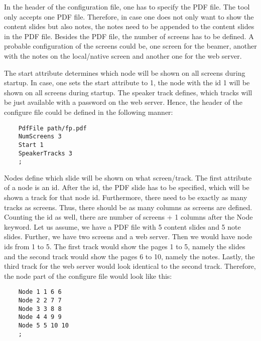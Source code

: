     In the header of the configuration file, one has to specify the PDF file.
    The tool only accepts one PDF file.
    Therefore, in case one does not only want to show the content slides but also notes, the notes need to be appended to the content slides in the PDF file.
    Besides the PDF file, the number of screens has to be defined.
    A probable configuration of the screens could be, one screen for the beamer, another with the notes on the local/native screen and another one for the web server.
    
    The start attribute determines which node will be shown on all screens during startup.
    In case, one sets the start attribute to 1, the node with the id 1 will be shown on all screens during startup.
    The speaker track defines, which tracks will be just available with a password on the web server.
    Hence, the header of the configure file could be defined in the following manner:
    \begin{verbatim}
    PdfFile path/fp.pdf
    NumScreens 3
    Start 1
    SpeakerTracks 3
    ;
    \end{verbatim}
    
    Nodes define which slide will be shown on what screen/track.
    The first attribute of a node is an id.
    After the id, the PDF slide has to be specified, which will be shown a track for that node id.
    Furthermore, there need to be exactly as many tracks as screens.
    Thus, there should be as many columns as screens are defined.
    Counting the id as well, there are number of screens + 1 columns after the Node keyword.
    Let us assume, we have a PDF file with 5 content slides and 5 note slides.
    Further, we have two screens and a web server.
    Then we would have node ids from 1 to 5.
    The first track would show the pages 1 to 5, namely the slides and the second track would show the pages 6 to 10, namely the notes.
    Lastly, the third track for the web server would look identical to the second track.
    Therefore, the node part of the configure file would look like this:
    \begin{verbatim}
    Node 1 1 6 6
    Node 2 2 7 7
    Node 3 3 8 8
    Node 4 4 9 9
    Node 5 5 10 10
    ;
    \end{verbatim}
    
